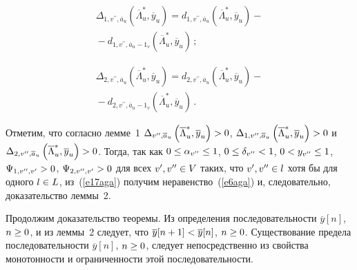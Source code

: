 \begin{multicols}{2}
\vspace*{-12pt}

\noindent
\begin{multline*}
   \Delta_{1,v^{\prime\prime},\overline{a}_u}\left(\overline{\Lambda}^*_u, 
\overline{y}_u\right) =
   d_{1, v^{\prime\prime},\overline{a}_u} \left(\overline{\Lambda}_u^*, 
\overline{y}_u\right) -{}\\
{}-d_{1, v^{\prime\prime},\overline{a}_u-
1_v}\left(\overline{\Lambda}_u^*, \overline{y}_u\right)\,;
\end{multline*}

\vspace*{-12pt}

\noindent
\begin{multline*}
   \Delta_{2,v^{\prime\prime},\overline{a}_u}\left(\overline{\Lambda}^*_u, 
\overline{y}_u\right) =
   d_{2, v^{\prime\prime},\overline{a}_u} \left(\overline{\Lambda}_u^*, 
\overline{y}_u\right) -{}\\
{}-d_{2, v^{\prime\prime},\overline{a}_u-
1_v}\left(\overline{\Lambda}_u^*, \overline{y}_u\right)\,.
\end{multline*}
   
   Отметим, что согласно лемме~1 
   $\Delta_{v^{\prime\prime}, \overline{a}_u} \left(\overline{\Lambda}_u^*, 
\overline{y}_u\right)\hm>0$,  $\Delta_{1, v^{\prime\prime}, \overline{a}_u} 
\left(\overline{\Lambda}_u^*, \overline{y}_u\right)\hm>0$ и $\Delta_{2, 
v^{\prime\prime}, \overline{a}_u} \left(\overline{\Lambda}_u^*, 
\overline{y}_u\right)\hm>0$. Тогда, так как $0\hm\leq \alpha_{v^{\prime\prime}}\leq 1$,
$0\hm\leq \delta_{v^{\prime\prime}}\hm<1$, $0\hm< y_{ v^{\prime\prime}}\hm\leq 1$, 
$\Psi_{1, v^{\prime\prime}, v^\prime}\hm>0$, $\Psi_{2, v^{\prime\prime}, 
v^\prime}\hm>0$  для всех $v^\prime,  v^{\prime\prime}\hm\in V$ таких, что 
$v^\prime, v^{\prime\prime}\hm\in l$ хотя бы для одного $l\hm\in L$, 
из~(\ref{e17aga}) получим неравенство~(\ref{e6aga}) и, следовательно, 
доказательство леммы~2.
     
     Продолжим доказательство теоремы. Из определения 
последовательности $\overline{y}[n]$, $n\hm\geq 0$, и из леммы~2 следует, 
что $\overline{y}[n+1]\hm< \overline{y}[n]$, $n\hm\geq 0$. Существование 
предела последовательности $\overline{y}[n]$, $n\hm\geq 0$,\linebreak
 следует 
непосредственно из свойства мо\-но\-тон\-ности и ограниченности этой 
последовательности. 
     

\end{multicols}

